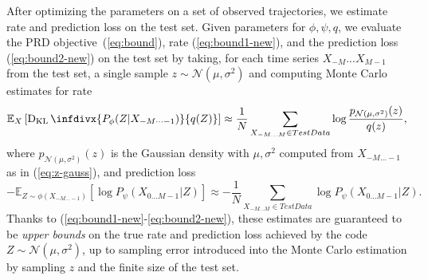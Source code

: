 \documentclass[entropy,article,submit,moreauthors,pdftex,10pt,a4paper]{Definitions/mdpi}
\newcommand{\finitefuture}{X_{0\dots M-1}}
\begin{document}
After optimizing the parameters on a set of observed trajectories, we estimate rate and prediction loss on the test set.
Given parameters for $\phi, \psi, q$, we evaluate the PRD objective~(\ref{eq:bound}), rate (\ref{eq:bound1-new}), and the prediction loss (\ref{eq:bound2-new}) on the test set by taking, for each time series $X_{-M}...X_{M-1}$ from the test set, a single sample $z  \sim \mathcal{N}(\mu, \sigma^2)$ and computing Monte Carlo estimates for rate
\begin{equation}\label{eq:bound-mc-rate}
\mathbb{E}_{X}\left[ \operatorname{D_{KL}}\infdivx{P_\phi(Z|X_{-M\dots -1})}{q(Z)}\right] \approx	\frac{1}{N}	\sum_{X_{-M...M} \in TestData}  \log \frac{p_{\mathcal{N}(\mu, \sigma^2)}(z)}{q(z)},
\end{equation}
where $p_{\mathcal{N}(\mu, \sigma^2)}(z)$ is the Gaussian density with $\mu, \sigma^2$ computed from $X_{-M\dots -1}$ as in (\ref{eq:z-gauss}), and prediction loss 
\begin{equation}\label{eq:bound-mc-distortion}
 -	\mathbb{E}_{Z \sim \phi(X_{-M\dots-1})}\left[\log P_\psi(\finitefuture | Z)\right] \approx - \frac{1}{N}	\sum_{X_{-M...M} \in TestData}	\log P_\psi(\finitefuture | Z).
\end{equation}
Thanks to (\ref{eq:bound1-new}-\ref{eq:bound2-new}), these estimates are guaranteed to be \emph{upper bounds} on the true rate and prediction loss achieved by the code $Z  \sim \mathcal{N}(\mu, \sigma^2)$, up to sampling error introduced into the Monte Carlo estimation by sampling $z$ and the finite size of the test set.


\end{document}
